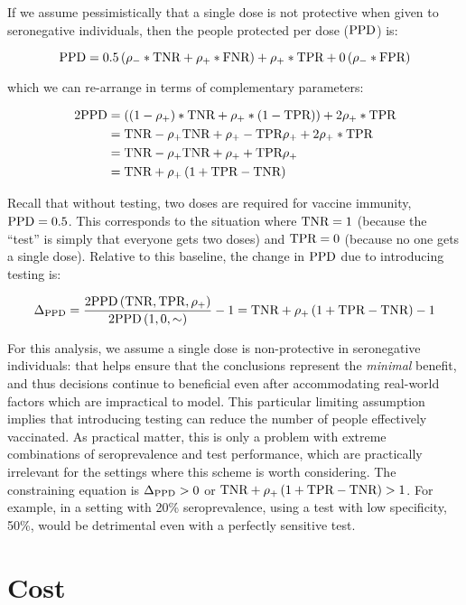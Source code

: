 \documentclass{article}
\begin{document}
If we assume pessimistically that a single dose is not protective when given to seronegative individuals, then the people protected per dose ($\textrm{PPD}$) is:

$$
\textrm{PPD} = 0.5\left(\rho_{{-}} * \textrm{TNR} + \rho_{{+}} * \textrm{FNR} \right) + \rho_{{+}}*\textrm{TPR} + 0\left(\rho_{{-}} * \textrm{FPR}\right)
$$

which we can re-arrange in terms of complementary parameters:

\begin{equation}\label{ppd}
\begin{aligned}
2\textrm{PPD} &= \left((1-\rho_{{+}}) * \textrm{TNR} + \rho_{{+}} * (1-\textrm{TPR}) \right) + 2\rho_{{+}}*\textrm{TPR} \\
&= \textrm{TNR}-\rho_{{+}}\textrm{TNR} + \rho_{{+}} - \textrm{TPR}\rho_{{+}} + 2\rho_{{+}}*\textrm{TPR} \\
&= \textrm{TNR} - \rho_{{+}}\textrm{TNR} + \rho_{{+}} + \textrm{TPR}\rho_{{+}} \\
&= \textrm{TNR} + \rho_{{+}} \left(1 + \textrm{TPR}-\textrm{TNR}\right)
\end{aligned}
\end{equation}

Recall that without testing, two doses are required for vaccine immunity, \ie* $\textrm{PPD}=0.5$. This corresponds to the situation where $\textrm{TNR}=1$ (because the ``test'' is simply that everyone gets two doses) and $\textrm{TPR}=0$ (because no one gets a single dose). Relative to this baseline, the change in $\textrm{PPD}$ due to introducing testing is:

$$
\Delta_{\textrm{PPD}} = \frac{2\textrm{PPD}\left(\textrm{TNR},\textrm{TPR},\rho_{{+}}\right)}{2\textrm{PPD}\left(1,0,\sim\right)} - 1 = \textrm{TNR} + \rho_{{+}} \left(1 + \textrm{TPR}-\textrm{TNR}\right) - 1
$$

For this analysis, we assume a single dose is non-protective in seronegative individuals: that helps ensure that the conclusions represent the {\em minimal} benefit, and thus decisions continue to beneficial even after accommodating real-world factors which are impractical to model. This particular limiting assumption implies that introducing testing can reduce the number of people effectively vaccinated. As practical matter, this is only a problem with extreme combinations of seroprevalence and test performance, which are practically irrelevant for the settings where this scheme is worth considering. The constraining equation is $\Delta_{\textrm{PPD}} > 0$ or $\textrm{TNR} + \rho_{{+}} \left(1 + \textrm{TPR}-\textrm{TNR}\right) > 1$. For example, in a setting with 20\% seroprevalence, using a test with low specificity, 50\%, would be detrimental even with a perfectly sensitive test. 

\section{Cost}
\end{document}

